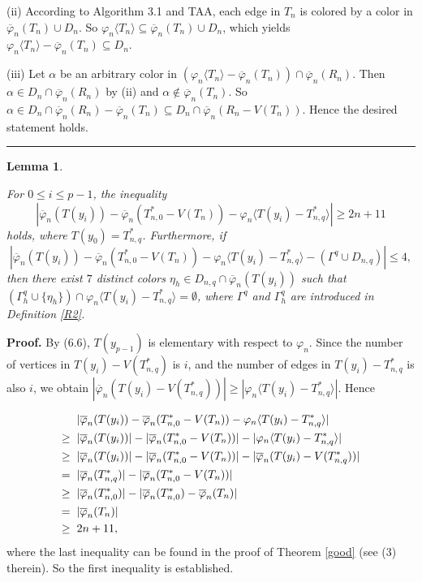 \documentclass[11pt]{article}
\newtheorem{lemma}[theorem]{Lemma}
\newcommand{\phibar}{\overline{\varphi}}
\def\qed{\hfill \rule{4pt}{7pt}}
\begin{document}
(ii) According to Algorithm 3.1 and TAA, each edge in $T_n$ is colored by a color in $\phibar_n(T_n) \cup D_n$.
So $\varphi_n \langle T_n \rangle \subseteq \phibar_n(T_n) \cup D_n$, which yields 
$\varphi_n \langle T_n \rangle-\phibar_n(T_n)\subseteq D_n$.

(iii) Let $\alpha$ be an arbitrary color in $(\varphi_n \langle T_n \rangle-\phibar_n(T_n))\cap \phibar_n(R_n)$.
Then $\alpha \in D_n \cap \phibar_n(R_n)$ by (ii) and $\alpha \notin \phibar_n(T_n)$. So $\alpha \in D_n \cap \phibar_n(R_n)
-\phibar_n(T_n) \subseteq D_n\cap \phibar_n(R_n-V(T_n))$. Hence the desired statement holds. \qed
\fi

\begin{lemma}\label{9n}

For $0 \le i \le p-1$, the inequality
$$|\overline{\varphi}_n(T(y_i))- \phibar_n(T_{n,0}^*-V(T_n)) - \varphi_n \langle T(y_i) - T_{n,q}^* \rangle | \geq 2n+11$$
holds, where $T(y_0)=T_{n,q}^*$. Furthermore, if 
$$|\overline{\varphi}_n(T(y_i))- \phibar_n(T_{n,0}^*-V(T_n)) - \varphi_n \langle T(y_i) - T_{n,q}^* \rangle
-(\Gamma^{q}\cup D_{n,q}) |\le 4,$$
then there exist $7$ distinct colors $\eta_{h}\in D_{n,q}\cap \phibar_n(T(y_i))$ such that  $(\Gamma^{q}_h \cup \{\eta_{h}\})
\cap \varphi_n \langle T(y_i) - T_{n,q}^* \rangle=\emptyset$, where $\Gamma^{q}$ and
$\Gamma^{q}_h$ are introduced in Definition \ref{R2}.
\end{lemma}

{\bf Proof.} By (6.6), $T(y_{p-1})$ is elementary with respect to $\varphi_n$. Since the number of vertices in $T(y_i)-V(T_{n,q}^*)$ is $i$, and the number of edges in 
$T(y_i) - T_{n,q}^*$ is also $i$, we obtain $|\overline{\varphi}_n (T(y_i) - V(T_{n,q}^*))| \ge | \varphi_n \langle 
T(y_i) - T_{n,q}^* \rangle|$. Hence 

\begin{equation*}
\begin{aligned}
& \hskip 2mm |\overline{\varphi}_n(T(y_i))- \phibar_n(T_{n,0}^*-V(T_n)) - \varphi_n \langle T(y_i) - T_{n,q}^* \rangle |\\
   \ge  & \hskip 2mm |\overline{\varphi}_n(T(y_i))|- |\phibar_n(T_{n,0}^*-V(T_n))| - |\varphi_n \langle T(y_i) - T_{n,q}^* \rangle |\\
 \ge & \hskip 2mm |\overline{\varphi}_n(T(y_i))| - |\phibar_n(T_{n,0}^*-V(T_n))| - |\overline{\varphi}_n (T(y_i) - V(T_{n,q}^*))| \\
 = & \hskip 2mm |\overline{\varphi}_n(T_{n,q}^*)| - |\phibar_n(T_{n,0}^*-V(T_n))| \\
 \ge & \hskip 2mm |\overline{\varphi}_n(T_{n,0}^*)| - |\phibar_n(T_{n,0}^*)- \phibar_n(T_n)| \\
  = & \hskip 2mm |\overline{\varphi}_n(T_n)|\\
  \ge & \hskip 2mm 2n+11, 
\end{aligned}
\end{equation*}
where the last inequality can be found in the proof of Theorem \ref{good} (see (3) therein).  So the first inequality is
established.
\end{document}
